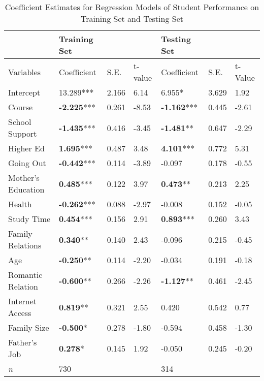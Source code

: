 \documentclass[sigconf]{acmart}
\begin{document}
\begin{table*}[ht]
  \caption{Coefficient Estimates for Regression Models of Student Performance on 
  Training Set and Testing Set}
  \label{tab:freq}
  \begin{tabular}{lllllll}
    \toprule
                        & Training Set      &        &         & Testing Set &         &          \\
    \midrule
    Variables           & Coefficient        & S.E.  & t-value & Coefficient & S.E. & t-Value  \\
    \midrule
 Intercept           &       13.289***    & 2.166 &  6.14  &          6.955*     & 3.629 &  1.92 \\
    Course              & \textbf{-2.225}*** & 0.261 & -8.53  & \textbf{-1.162}***  & 0.445 & -2.61 \\
    School Support      & \textbf{-1.435}*** & 0.416 & -3.45  & \textbf{-1.481}**   & 0.647 & -2.29 \\
    Higher Ed           & \textbf{ 1.695}*** & 0.487 &  3.48  & \textbf{ 4.101}***  & 0.772 &  5.31 \\
    Going Out           & \textbf{-0.442}*** & 0.114 & -3.89  &         -0.097      & 0.178 & -0.55 \\
    Mother's Education  & \textbf{ 0.485}*** & 0.122 &  3.97  & \textbf{ 0.473}**   & 0.213 &  2.25 \\
    Health              & \textbf{-0.262}*** & 0.088 & -2.97  &         -0.008      & 0.152 & -0.05 \\
    Study Time          & \textbf{ 0.454}*** & 0.156 &  2.91  & \textbf{ 0.893}***  & 0.260 &  3.43 \\
    Family Relations    & \textbf{ 0.340}**  & 0.140 &  2.43  &         -0.096      & 0.215 & -0.45 \\
    Age                 & \textbf{-0.250}**  & 0.114 & -2.20  &         -0.034      & 0.191 & -0.18 \\
    Romantic Relation   & \textbf{-0.600}**  & 0.266 & -2.26  & \textbf{-1.127}**   & 0.461 & -2.45 \\
    Internet Access     & \textbf{ 0.819}**  & 0.321 &  2.55  &          0.420      & 0.542 &  0.77 \\
    Family Size         & \textbf{-0.500}*   & 0.278 & -1.80  &         -0.594      & 0.458 & -1.30 \\
    Father's Job        & \textbf{ 0.278}*   & 0.145 &  1.92  &         -0.050      & 0.245 & -0.20 \\
    \midrule
    \textit{n}          &       730          &       &        &         314         &       &       \\

\end{tabular}
\end{table*}
\end{document}
